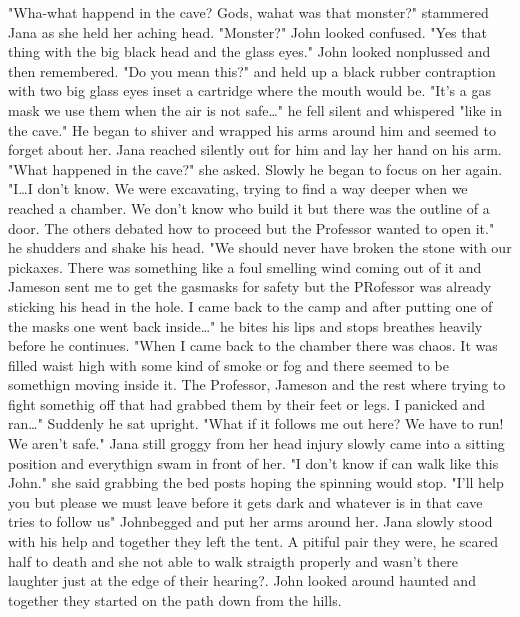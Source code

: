 "Wha-what happend in the cave? Gods, wahat was that monster?" stammered Jana as she held her aching head. "Monster?" John looked confused. "Yes that thing with the big black head and the glass eyes." John looked nonplussed and then remembered. "Do you mean this?" and held up a black rubber contraption with two big glass eyes inset a cartridge where the mouth would be. "It's a gas mask we use them when the air is not safe\dots" he fell silent and whispered "like in the cave." He began to shiver and wrapped his arms around him and seemed to forget about her. Jana reached silently out for him and lay her hand on his arm. "What happened in the cave?" she asked. Slowly he began to focus on her again. "I\dots I don't know. We were excavating, trying to find a way deeper when we reached a chamber. We don't know who build it but there was the outline of a door. The others debated how to proceed but the Professor wanted to open it." he shudders and shake his head. "We should never have broken the stone with our pickaxes. There was something like a foul smelling wind coming out of it and Jameson sent me to get the gasmasks for safety but the PRofessor was already sticking his head in the hole. I came back to the camp and after putting one of the masks one went back inside\dots" he bites his lips and stops breathes heavily before he continues. "When I came back to the chamber there was chaos. It was filled waist high with some kind of smoke or fog and there seemed to be somethign moving inside it. The Professor, Jameson and the rest where trying to fight somethig off that had grabbed them by their feet or legs. I panicked and ran\dots" Suddenly he sat upright. "What if it follows me out here? We have to run! We aren't safe." Jana still groggy from her head injury slowly came into a sitting position and everythign swam in front of her. "I don't know if can walk like this John." she said grabbing the bed posts hoping the spinning would stop. "I'll help you but please we must leave before it gets dark and whatever is in that cave tries to follow us" Johnbegged and put her arms around her. Jana slowly stood with his help and together they left the tent. A pitiful pair they were, he scared half to death and she not able to walk straigth properly and wasn't there laughter just at the edge of their hearing?. John looked around haunted and together they started on the path down from the hills.

\newscene

